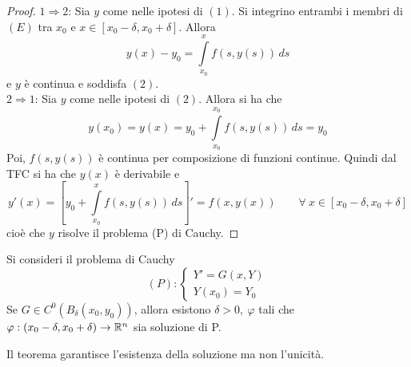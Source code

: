 \begin{proof}
    $1 \Rightarrow 2$: Sia $y$ come nelle ipotesi di $(1)$. Si integrino entrambi i membri di $(E)$ tra $x_0$ e $x \in [x_0-\delta, x_0+\delta]$. Allora
    \begin{equation}
        y(x)-y_0=\int\limits_{x_0}^{x}{f(s, y(s))}\,ds
    \end{equation}
    e $y$ è continua e soddisfa $(2)$.\\
    $2 \Rightarrow 1$: Sia $y$ come nelle ipotesi di $(2)$. Allora si ha che
    \begin{equation}
        y(x_0)=y(x)= y_0 + \int\limits_{x_0}^{x_0}{f(s, y(s))}\, ds= y_0
    \end{equation}
    Poi, $f(s, y(s))$ è continua per composizione di funzioni continue. Quindi dal TFC si ha che $y(x)$ è derivabile e
    \begin{equation}
        y'(x)= \left[y_0 + \int\limits_{x_0}^{x}{f(s, y(s))}\, ds\right]'= f(x, y(x)) \qquad \forall\ x \in [x_0-\delta, x_0+\delta]
    \end{equation}
    cioè che $y$ risolve il problema (P) di Cauchy.
\end{proof}
\begin{theorem}
Si consideri il problema di Cauchy
\begin{equation}
    (P): \begin{cases}
        Y'=G(x, Y)\\
        Y(x_0)=Y_0
    \end{cases}
\end{equation}
Se $G \in C^0(B_\delta(x_0, y_0))$, allora esistono $\delta>0,\ \varphi$ tali che $\varphi: (x_0- \delta, x_0+\delta) \to \mathbb{R}^n$ sia soluzione di P.
\end{theorem}
Il teorema garantisce l'esistenza della soluzione ma non l'unicità.
